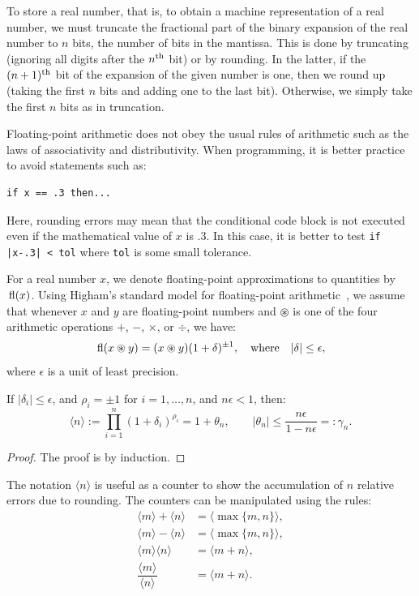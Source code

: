 To store a real number, that is, to obtain a machine representation of a real number, we must truncate the fractional part of the binary expansion of the real number to $n$ bits, the number of bits in the mantissa. This is done by truncating (ignoring all digits after the $n^{\rm th}$ bit) or by rounding. In the latter, if the $(n+1)^{\rm th}$ bit of the expansion of the given number is one, then we round up (taking the first $n$ bits and adding one to the last bit). Otherwise, we simply take the first $n$ bits as in truncation.

Floating-point arithmetic does not obey the usual rules of arithmetic such as the laws of associativity and distributivity. When programming, it is better practice to avoid statements such as:
\begin{verbatim}
if x == .3 then...
\end{verbatim}
Here, rounding errors may mean that the conditional code block is not executed even if the mathematical value of $x$ is $.3$. In this case, it is better to test \verb+if |x-.3| < tol+ where \verb+tol+ is some small tolerance.

For a real number $x$, we denote floating-point approximations to quantities by ${\rm\,fl}(x)$. Using Higham's standard model for floating-point arithmetic~\cite{Higham-02}, we assume that whenever $x$ and $y$ are floating-point numbers and $\circledast$ is one of the four arithmetic operations $+$, $-$, $\times$, or $\div$, we have:
\begin{equation}
{\rm\,fl}(x\circledast y) = (x\circledast y)(1+\delta)^{\pm1},\quad{\rm where}\quad |\delta| \le \epsilon,
\end{equation}
where $\epsilon$ is a unit of least precision.

\begin{lemma}
If $|\delta_i|\le \epsilon$, and $\rho_i=\pm1$ for $i=1,\ldots,n$, and $n\epsilon<1$, then:
\begin{equation}
\langle n \rangle := \prod_{i=1}^n(1+\delta_i)^{\rho_i} = 1+\theta_n,\qquad |\theta_n| \le \dfrac{n\epsilon}{1-n\epsilon} =:\gamma_n.
\end{equation}
\end{lemma}
\begin{proof}
The proof is by induction.
\end{proof}
The notation $\langle n \rangle$ is useful as a counter to show the accumulation of $n$ relative errors due to rounding. The counters can be manipulated using the rules:
\begin{align}
\langle m\rangle + \langle n\rangle & = \langle\max\{m,n\}\rangle,\\
\langle m\rangle - \langle n\rangle & = \langle\max\{m,n\}\rangle,\\
\langle m\rangle\langle n\rangle & = \langle m+n\rangle,\\
\dfrac{\langle m\rangle}{\langle n\rangle} & = \langle m+n\rangle.
\end{align}

